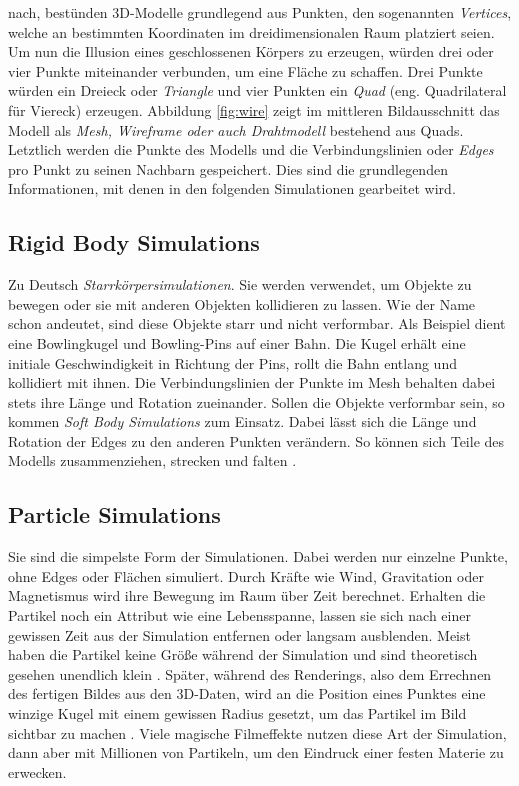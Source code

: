 \citet[]{menace-2021} nach, bestünden 3D-Modelle grundlegend aus Punkten, den sogenannten \textit{Vertices}, welche an bestimmten Koordinaten im dreidimensionalen Raum platziert seien. Um nun die Illusion eines geschlossenen Körpers zu erzeugen, würden drei oder vier Punkte miteinander verbunden, um eine Fläche zu schaffen. Drei Punkte würden ein Dreieck oder \textit{Triangle} und vier Punkten ein \textit{Quad} (eng. Quadrilateral für Viereck) erzeugen. Abbildung \ref{fig:wire} zeigt im mittleren Bildausschnitt das Modell als \textit{Mesh, Wireframe oder auch Drahtmodell} bestehend aus Quads. Letztlich werden die Punkte des Modells und die Verbindungslinien oder \textit{Edges} pro Punkt zu seinen Nachbarn gespeichert. Dies sind die grundlegenden Informationen, mit denen in den folgenden Simulationen gearbeitet wird.

\subsection{Rigid Body Simulations} 
Zu Deutsch \textit{Starrkörpersimulationen}. Sie werden verwendet, um Objekte zu bewegen oder sie mit anderen Objekten kollidieren zu lassen. Wie der Name schon andeutet, sind diese Objekte starr und nicht verformbar. Als Beispiel dient eine Bowlingkugel und Bowling-Pins auf einer Bahn. Die Kugel erhält eine initiale Geschwindigkeit in Richtung der Pins, rollt die Bahn entlang und kollidiert mit ihnen. Die Verbindungslinien der Punkte im Mesh behalten dabei stets ihre Länge und Rotation zueinander. Sollen die Objekte verformbar sein, so kommen \textit{Soft Body Simulations} zum Einsatz. Dabei lässt sich die Länge und Rotation der Edges zu den anderen Punkten verändern. So können sich Teile des Modells zusammenziehen, strecken und falten \parencite[]{baraff-2001}.

\subsection{Particle Simulations} 
Sie sind die simpelste Form der Simulationen. Dabei werden nur einzelne Punkte, ohne Edges oder Flächen simuliert. Durch Kräfte wie Wind, Gravitation oder Magnetismus wird ihre Bewegung im Raum über Zeit berechnet. Erhalten die Partikel noch ein Attribut wie eine Lebensspanne, lassen sie sich nach einer gewissen Zeit aus der Simulation entfernen oder langsam ausblenden. Meist haben die Partikel keine Größe während der Simulation und sind theoretisch gesehen unendlich klein \parencite[]{reeves}. Später, während des Renderings, also dem Errechnen des fertigen Bildes aus den 3D-Daten, wird an die Position eines Punktes eine winzige Kugel mit einem gewissen Radius gesetzt, um das Partikel im Bild sichtbar zu machen \parencite[]{sidefxparicle}. Viele magische Filmeffekte nutzen diese Art der Simulation, dann aber mit Millionen von Partikeln, um den Eindruck einer festen Materie zu erwecken.

